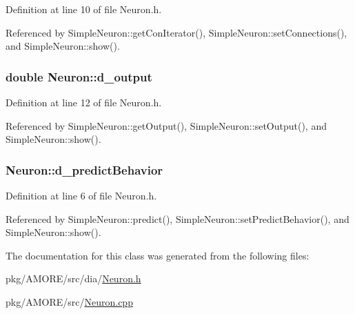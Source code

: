 Definition at line 10 of file Neuron.h.



Referenced by SimpleNeuron::getConIterator(), SimpleNeuron::setConnections(), and SimpleNeuron::show().

\hypertarget{class_neuron_a1e0b130755580b323da98c5332a6610e}{
\subsubsection[{d\_\-output}]{\setlength{\rightskip}{0pt plus 5cm}double {\bf Neuron::d\_\-output}}}
\label{class_neuron_a1e0b130755580b323da98c5332a6610e}


Definition at line 12 of file Neuron.h.



Referenced by SimpleNeuron::getOutput(), SimpleNeuron::setOutput(), and SimpleNeuron::show().

\hypertarget{class_neuron_a2522e221f58c84bd3a1c32647da4a411}{
\subsubsection[{d\_\-predictBehavior}]{ {\bf Neuron::d\_\-predictBehavior}}}
\label{class_neuron_a2522e221f58c84bd3a1c32647da4a411}


Definition at line 6 of file Neuron.h.



Referenced by SimpleNeuron::predict(), SimpleNeuron::setPredictBehavior(), and SimpleNeuron::show().



The documentation for this class was generated from the following files:\begin{DoxyCompactItemize}
\item 
pkg/AMORE/src/dia/\hyperlink{_neuron_8h}{Neuron.h}\item 
pkg/AMORE/src/\hyperlink{_neuron_8cpp}{Neuron.cpp}\end{DoxyCompactItemize}

